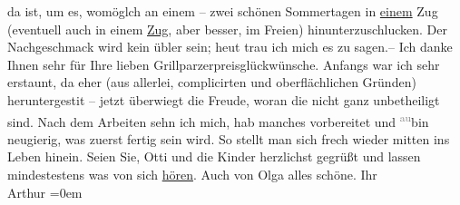 \begin{ledgroupsized}[t]{13cm}
               da ist, um es, womöglch an einem – zwei schönen Sommertagen in \uline{einem} Zug (eventuell auch in einem \uline{Zug},
               aber besser, im Freien) hinunterzuschlucken. Der Nachgeschmack wird kein übler sein;
               heut trau ich mich es zu sagen.– \pend
           \pstart
           Ich danke Ihnen sehr für Ihre lieben Grillparzerpreisglückwünsche. Anfangs war ich sehr erstaunt, da{\geminationn} eher (aus allerlei, complicirten und oberflächlichen
               Gründen) heruntergesti{\geminationm}t – jetzt überwiegt die Freude,
               woran die {\pb}\label{K_L03011-22v}\label{K_L03011-22h} nicht ganz unbetheiligt
               sind. Nach dem Arbeiten sehn ich mich, hab manches vorbereitet und \substVorne{}\textsuperscript{\textcolor{gray}{au}}\substDazwischen{}bin\substHinten{} neugierig, was zuerst fertig sein wird. So stellt man sich frech
               wieder mitten ins Leben hinein. \pend
           \pstart
           Seien Sie, Otti und die Kinder
               herzlichst gegrüßt und lassen mindestestens was von sich \uline{hören}. Auch von Olga alles schöne.\pend
           \pstart
           Ihr {\\[\baselineskip]}\spacefill\mbox{Arthur}\pend
           \leftskip=0em{}
         
         \endnumbering{}\end{ledgroupsized}\begin{anhang}\end{anhang}\newcommand{\dateiname}{L03011}\newcommand{\titel}{Arthur Schnitzler an Felix Salten, 25. 1. 1908}\newcommand{\editorInnen}{Martin Anton Müller und Laura Untner}
      
